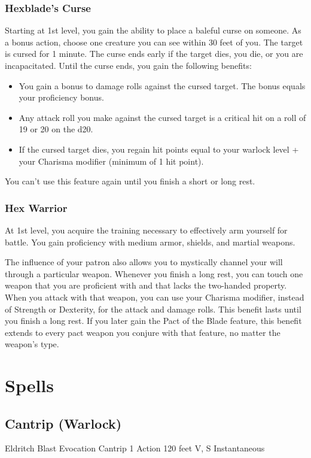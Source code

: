 \documentclass[letterpaper,openany,oneside,twocolumn]{book}
\begin{document}
\subsubsection*{Hexblade's Curse}
Starting at 1st level, you gain the ability to place a baleful curse on someone. As a bonus action, choose one creature you can see within 30 feet of you. The target is cursed for 1 minute. The curse ends early if the target dies, you die, or you are incapacitated. Until the curse ends, you gain the following benefits:
\begin{itemize}
	\item You gain a bonus to damage rolls against the cursed target. The bonus equals your proficiency bonus.
	\item Any attack roll you make against the cursed target is a critical hit on a roll of 19 or 20 on the d20.
	\item If the cursed target dies, you regain hit points equal to your warlock level + your Charisma modifier (minimum of 1 hit point).
\end{itemize}
You can't use this feature again until you finish a short or long rest.
\subsubsection*{Hex Warrior}
At 1st level, you acquire the training necessary to effectively arm yourself for battle. You gain proficiency with medium armor, shields, and martial weapons.

The influence of your patron also allows you to mystically channel your will through a particular weapon. Whenever you finish a long rest, you can touch one weapon that you are proficient with and that lacks the two-handed property. When you attack with that weapon, you can use your Charisma modifier, instead of Strength or Dexterity, for the attack and damage rolls. This benefit lasts until you finish a long rest. If you later gain the Pact of the Blade feature, this benefit extends to every pact weapon you conjure with that feature, no matter the weapon's type.

\section*{Spells}
\subsection*{Cantrip (Warlock)}

\DndSpellHeader
  {Eldritch Blast}
  {Evocation Cantrip}
  {1 Action}
  {120 feet}
  {V, S}
  {Instantaneous}
\end{document}
